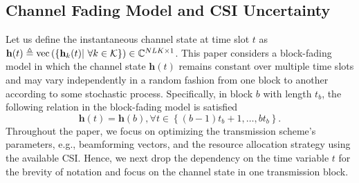 \documentclass[12pt,draftcls,onecolumn]{IEEEtran}
\theoremstyle{remark}
\theoremstyle{definition}
\begin{document}
 \subsection{Channel Fading Model and CSI Uncertainty}
Let us define the instantaneous channel state at time slot $t$ as $\mathbf{h}(t) \triangleq {\rm vec}\left(\left\lbrace\mathbf{h}_{k}(t) |\,\, \forall k\in\mathcal{K} \right\rbrace\right)  \in \mathbb{C}^{NLK\times 1}$. This paper considers a block-fading model in which the channel state $\mathbf{h}(t)$ remains constant over multiple time slots and may vary independently in a random fashion from one block to another according to some stochastic process. Specifically, in block $b$ with length $t_b$, the following relation in the block-fading model is satisfied
\begin{equation}
\mathbf{h}(t) = \mathbf{h}(b), \forall t \in \left\lbrace(b-1)t_b+1,\ldots, b t_b  \right\rbrace.
\end{equation}
Throughout the paper, we focus on optimizing the transmission scheme's parameters, e.g., beamforming vectors, and the resource allocation strategy using the available CSI. Hence, we next drop the dependency on the time variable $t$ for the brevity of notation and focus on the channel state in one transmission block. %
\end{document}

